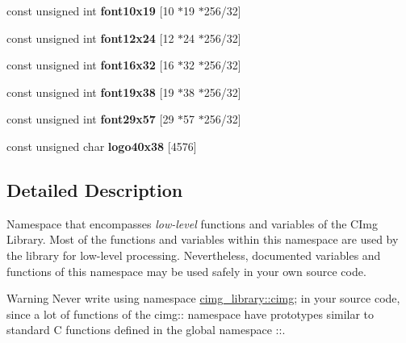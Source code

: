 \begin{DoxyCompactItemize}
\item 
\hypertarget{namespacecimg__library_1_1cimg_a7dcb5974dbf9283207fb8377e5aee88d}{
const unsigned int {\bfseries font10x19} \mbox{[}10 $\ast$19 $\ast$256/32\mbox{]}}
\label{namespacecimg__library_1_1cimg_a7dcb5974dbf9283207fb8377e5aee88d}

\item 
\hypertarget{namespacecimg__library_1_1cimg_a249e878ab6f8b99f1a0e67679d58974f}{
const unsigned int {\bfseries font12x24} \mbox{[}12 $\ast$24 $\ast$256/32\mbox{]}}
\label{namespacecimg__library_1_1cimg_a249e878ab6f8b99f1a0e67679d58974f}

\item 
\hypertarget{namespacecimg__library_1_1cimg_a7bc04f7144f3dbfd0499d80e2911564f}{
const unsigned int {\bfseries font16x32} \mbox{[}16 $\ast$32 $\ast$256/32\mbox{]}}
\label{namespacecimg__library_1_1cimg_a7bc04f7144f3dbfd0499d80e2911564f}

\item 
\hypertarget{namespacecimg__library_1_1cimg_ac2c1c25ffa2ceb4063ff39e5198a186d}{
const unsigned int {\bfseries font19x38} \mbox{[}19 $\ast$38 $\ast$256/32\mbox{]}}
\label{namespacecimg__library_1_1cimg_ac2c1c25ffa2ceb4063ff39e5198a186d}

\item 
\hypertarget{namespacecimg__library_1_1cimg_a1072daf041b6eb82545ca7494ceb3ff7}{
const unsigned int {\bfseries font29x57} \mbox{[}29 $\ast$57 $\ast$256/32\mbox{]}}
\label{namespacecimg__library_1_1cimg_a1072daf041b6eb82545ca7494ceb3ff7}

\item 
const unsigned char {\bfseries logo40x38} \mbox{[}4576\mbox{]}
\end{DoxyCompactItemize}


\subsection{Detailed Description}
Namespace that encompasses {\itshape low-\/level\/} functions and variables of the CImg Library. Most of the functions and variables within this namespace are used by the library for low-\/level processing. Nevertheless, documented variables and functions of this namespace may be used safely in your own source code.

\begin{DoxyWarning}{Warning}
Never write {\ttfamily using namespace \hyperlink{namespacecimg__library_1_1cimg}{cimg\_\-library::cimg};} in your source code, since a lot of functions of the {\ttfamily cimg::} namespace have prototypes similar to standard C functions defined in the global namespace {\ttfamily ::}. 
\end{DoxyWarning}


